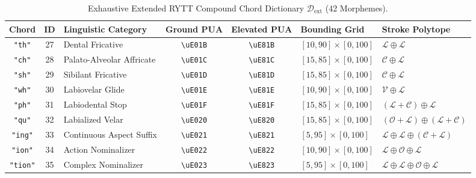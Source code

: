 \documentclass[11pt,oneside,letterpaper]{article}
\theoremstyle{definition}
\begin{document}
\begin{table}[b]
\centering
\footnotesize
\caption{Exhaustive Extended RYTT Compound Chord Dictionary $\mathcal{D}_{\text{ext}}$ (42 Morphemes).}
\label{tab:extended_chords}
\begin{tabularx}{\textwidth}{cc>{\raggedright\arraybackslash}Xcc>{\raggedright\arraybackslash}p{3.2cm}>{\raggedright\arraybackslash}X}
\toprule
\textbf{Chord} & \textbf{ID} & \textbf{Linguistic Category} & \textbf{Ground PUA} & \textbf{Elevated PUA} & \textbf{Bounding Grid} & \textbf{Stroke Polytope} \\
\midrule
\texttt{"th"}   & 27 & Dental Fricative           & \texttt{\textbackslash uE01B} & \texttt{\textbackslash uE81B} & $[10, 90] \times [0, 100]$ & $\mathcal{L} \oplus \mathcal{L}$ \\
\texttt{"ch"}   & 28 & Palato-Alveolar Affricate  & \texttt{\textbackslash uE01C} & \texttt{\textbackslash uE81C} & $[15, 85] \times [0, 100]$ & $\mathcal{C} \oplus \mathcal{L}$ \\
\texttt{"sh"}   & 29 & Sibilant Fricative         & \texttt{\textbackslash uE01D} & \texttt{\textbackslash uE81D} & $[15, 85] \times [0, 100]$ & $\mathcal{C} \oplus \mathcal{L}$ \\
\texttt{"wh"}   & 30 & Labiovelar Glide           & \texttt{\textbackslash uE01E} & \texttt{\textbackslash uE81E} & $[10, 90] \times [0, 100]$ & $\mathcal{V} \oplus \mathcal{L}$ \\
\texttt{"ph"}   & 31 & Labiodental Stop           & \texttt{\textbackslash uE01F} & \texttt{\textbackslash uE81F} & $[15, 85] \times [0, 100]$ & $(\mathcal{L}+\mathcal{C}) \oplus \mathcal{L}$ \\
\texttt{"qu"}   & 32 & Labialized Velar           & \texttt{\textbackslash uE020} & \texttt{\textbackslash uE820} & $[15, 85] \times [0, 100]$ & $(\mathcal{O}+\mathcal{L}) \oplus (\mathcal{L}+\mathcal{C})$ \\
\texttt{"ing"}  & 33 & Continuous Aspect Suffix   & \texttt{\textbackslash uE021} & \texttt{\textbackslash uE821} & $[5, 95] \times [0, 100]$  & $\mathcal{L} \oplus \mathcal{L} \oplus (\mathcal{C}+\mathcal{L})$ \\
\texttt{"ion"}  & 34 & Action Nominalizer         & \texttt{\textbackslash uE022} & \texttt{\textbackslash uE822} & $[10, 90] \times [0, 100]$ & $\mathcal{L} \oplus \mathcal{O} \oplus \mathcal{L}$ \\
\texttt{"tion"} & 35 & Complex Nominalizer        & \texttt{\textbackslash uE023} & \texttt{\textbackslash uE823} & $[5, 95] \times [0, 100]$  & $\mathcal{L} \oplus \mathcal{L} \oplus \mathcal{O} \oplus \mathcal{L}$ \\

\end{tabularx}
\end{table}
\end{document}

